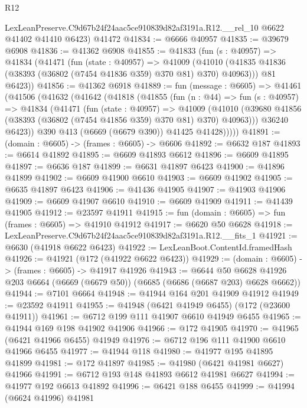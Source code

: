 \begin{lexlean}{R12}
\begin{coremodule}
    LexLeanPreserve.C9d67b24f24aac5ce910839d82af3191a.R12.__rel_10 @6622 @41402 @41410 @6423)
    @41472
@41834 := @6666 @40957
@41835 := @39679 @6908
@41836 := @41362 @6908
@41855 := @41833
    (fun (s : @40957) =>
    @41834
      (@41471
        (fun (state : @40957) =>
        @41009 (@41010 (@41835 @41836 (@38393 (@36802 (@7454 @41836 @359) @370 @81) @370) @40963)))
        @81
        @6423))
@41856 := @41362 @6918
@41889 := fun (message : @6605) =>
  @41461
    (@41506
      (@41632
        (@41642
          (@41818
            (@41855
              (fun (n : @44) =>
              fun (s : @40957) =>
              @41834
                (@41471
                  (fun (state : @40957) =>
                  @41009
                    (@41010
                      (@39680 @41856 (@38393 (@36802 (@7454 @41856 @359) @370 @81) @370) @40963)))
                  @36240
                  @6423))
              @390
              @413
              (@6669 (@6679 @390))
              @41425
              @41428)))))
@41891 := (domain : @6605) -> (frames : @6605) -> @6606
@41892 := @6632 @187
@41893 := @6614 @41892
@41895 := @6609 @41893 @6612
@41896 := @6609 @41895
@41897 := @6636 @187
@41899 := @6631 @41897 @6423
@41900 := @41896 @41899
@41902 := @6609 @41900 @6610
@41903 := @6609 @41902
@41905 := @6635 @41897 @6423
@41906 := @41436 @41905
@41907 := @41903 @41906
@41909 := @6609 @41907 @6610
@41910 := @6609 @41909
@41911 := @41439 @41905
@41912 := @23597 @41911
@41915 := fun (domain : @6605) => fun (frames : @6605) => @41910 @41912
@41917 := @6620 @50 @6628
@41918 := LexLeanPreserve.C9d67b24f24aac5ce910839d82af3191a.R12.__fits_1
@41921 := @6630 (@41918 @6622 @6423)
@41922 := LexLeanBoot.ContentId.framedHash
@41926 := @41921 (@172 (@41922 @6622 @6423))
@41929 := (domain : @6605) -> (frames : @6605) -> @41917 @41926
@41943 := @6644
    @50
    @6628
    @41926
    @203
    @6664
    (@6669 (@6679 @50))
    (@6685 (@6686 (@6687 @203) @6628 @6662))
@41944 := @7101 @6664
@41948 := @41944 @164 @201 @41909 @41912
@41949 := @23592 @41911
@41955 := @41948 (@6421 @41949 @6455) (@172 (@23600 @41911))
@41961 := @6712 @199 @111 @41907 @6610 @41949 @6455
@41965 := @41944 @169 @198 @41902 @41906
@41966 := @172 @41905
@41970 := @41965 (@6421 @41966 @6455) @41949
@41976 := @6712 @196 @111 @41900 @6610 @41966 @6455
@41977 := @41944 @118
@41980 := @41977 @195 @41895 @41899
@41981 := @172 @41897
@41985 := @41980 (@6421 @41981 @6627) @41966
@41991 := @6712 @193 @148 @41893 @6612 @41981 @6627
@41994 := @41977 @192 @6613 @41892
@41996 := @6421 @188 @6455
@41999 := @41994 (@6624 @41996) @41981

\end{coremodule}
\end{lexlean}
